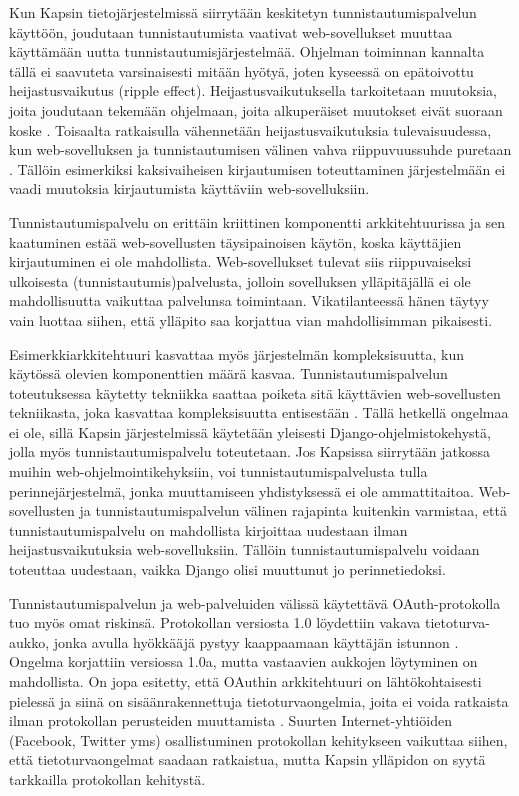 Kun Kapsin tietojärjestelmissä siirrytään keskitetyn tunnistautumispalvelun käyttöön, joudutaan tunnistautumista vaativat web-sovellukset muuttaa käyttämään uutta tunnistautumisjärjestelmää. Ohjelman toiminnan kannalta tällä ei saavuteta varsinaisesti mitään hyötyä, joten kyseessä on epätoivottu heijastusvaikutus (ripple effect). Heijastusvaikutuksella tarkoitetaan muutoksia, joita joudutaan tekemään ohjelmaan, joita alkuperäiset muutokset eivät suoraan koske \cite{arkkitehtuurit}. Toisaalta ratkaisulla vähennetään heijastusvaikutuksia tulevaisuudessa, kun web-sovelluksen ja tunnistautumisen välinen vahva riippuvuussuhde puretaan \cite{arkkitehtuurit}. Tällöin esimerkiksi kaksivaiheisen kirjautumisen toteuttaminen järjestelmään ei vaadi muutoksia kirjautumista käyttäviin web-sovelluksiin.

Tunnistautumispalvelu on erittäin kriittinen komponentti arkkitehtuurissa ja sen kaatuminen estää web-sovellusten täysipainoisen käytön, koska käyttäjien kirjautuminen ei ole mahdollista. Web-sovellukset tulevat siis riippuvaiseksi ulkoisesta (tunnistautumis)palvelusta, jolloin sovelluksen ylläpitäjällä ei ole mahdollisuutta vaikuttaa palvelunsa toimintaan. Vikatilanteessä hänen täytyy vain luottaa siihen, että ylläpito saa korjattua vian mahdollisimman pikaisesti.

Esimerkkiarkkitehtuuri kasvattaa myös järjestelmän kompleksisuutta, kun käytössä olevien komponenttien määrä kasvaa. Tunnistautumispalvelun toteutuksessa käytetty tekniikka saattaa poiketa sitä käyttävien web-sovellusten tekniikasta, joka kasvattaa kompleksisuutta entisestään \cite{arkkitehtuurit}. Tällä hetkellä ongelmaa ei ole, sillä Kapsin järjestelmissä käytetään yleisesti Django-ohjelmistokehystä, jolla myös tunnistautumispalvelu toteutetaan. Jos Kapsissa siirrytään jatkossa muihin web-ohjelmointikehyksiin, voi tunnistautumispalvelusta tulla perinnejärjestelmä, jonka muuttamiseen yhdistyksessä ei ole ammattitaitoa. Web-sovellusten ja tunnistautumispalvelun välinen rajapinta kuitenkin varmistaa, että tunnistautumispalvelu on mahdollista kirjoittaa uudestaan ilman heijastusvaikutuksia web-sovelluksiin. Tällöin tunnistautumispalvelu voidaan toteuttaa uudestaan, vaikka Django olisi muuttunut jo perinnetiedoksi.

Tunnistautumispalvelun ja web-palveluiden välissä käytettävä OAuth-protokolla tuo myös omat riskinsä. Protokollan versiosta 1.0 löydettiin vakava tietoturva-aukko, jonka avulla hyökkääjä pystyy kaappaamaan käyttäjän istunnon \cite{oauth_primer}. Ongelma korjattiin versiossa 1.0a, mutta vastaavien aukkojen löytyminen on mahdollista. On jopa esitetty, että OAuthin arkkitehtuuri on lähtökohtaisesti pielessä ja siinä on sisäänrakennettuja tietoturvaongelmia, joita ei voida ratkaista ilman protokollan perusteiden muuttamista \cite{oauth_lol}. Suurten Internet-yhtiöiden (Facebook, Twitter yms) osallistuminen protokollan kehitykseen vaikuttaa siihen, että tietoturvaongelmat saadaan ratkaistua, mutta Kapsin ylläpidon on syytä tarkkailla protokollan kehitystä.

